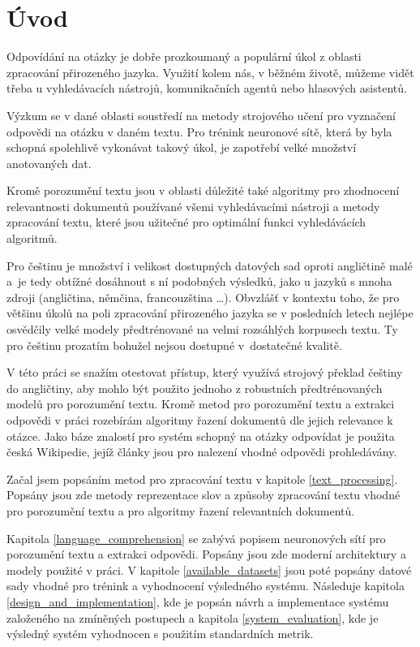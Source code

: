
\chapter{Úvod}
Odpovídání na otázky je dobře prozkoumaný a populární úkol z oblasti zpracování přirozeného jazyka. Využití kolem nás, v běžném životě, můžeme vidět třeba u vyhledávacích nástrojů, komunikačních agentů nebo hlasových asistentů.\par 
Výzkum se v dané oblasti soustředí na metody strojového učení pro vyznačení odpovědi na otázku v daném textu. Pro trénink neuronové sítě, která by byla schopná spolehlivě vykonávat takový úkol, je zapotřebí velké množství anotovaných dat.\par 
Kromě porozumění textu jsou v oblasti důležité také algoritmy pro zhodnocení relevantnosti dokumentů používané všemi vyhledávacími nástroji a metody zpracování textu, které jsou užitečné pro optimální funkci vyhledávácích algoritmů.\par
Pro češtinu je množství i velikost dostupných datových sad oproti angličtině malé a~je tedy obtížné dosáhnout s ní podobných výsledků, jako u jazyků s mnoha zdroji (angličtina, němčina, francouzština \dots). Obvzlášť v kontextu toho, že pro většinu úkolů na poli zpracování přirozeného jazyka se v posledních letech nejlépe osvědčily velké modely předtrénované na velmi rozsáhlých korpusech textu. Ty pro češtinu prozatím bohužel nejsou dostupné v~dostatečné kvalitě.\par
V této práci se snažím otestovat přístup, který využívá strojový překlad češtiny do angličtiny, aby mohlo být použito jednoho z robustních předtrénovaných modelů pro porozumění textu. Kromě metod pro porozumění textu a extrakci odpovědi v práci rozebírám algoritmy řazení dokumentů dle jejich relevance k otázce. Jako báze znalostí pro systém schopný na otázky odpovídat je použita česká Wikipedie, jejíž články jsou pro nalezení vhodné odpovědi prohledávány.\par
Začal jsem popsáním metod pro zpracování textu v kapitole \ref{text_processing}. Popsány jsou zde metody reprezentace slov a způsoby zpracování textu vhodné pro porozumění textu a pro algoritmy řazení relevantních dokumentů.\par
Kapitola \ref{language_comprehension} se zabývá popisem neuronových sítí pro porozumění textu a extrakci odpovědi. Popsány jsou zde moderní architektury a modely použité v práci. V kapitole \ref{available_datasets} jsou poté popsány datové sady vhodné pro trénink a vyhodnocení výsledného systému.
Následuje kapitola \ref{design_and_implementation}, kde je popsán návrh a implementace systému založeného na zmíněných postupech a kapitola \ref{system_evaluation}, kde je výsledný systém vyhodnocen s použitím standardních metrik.




